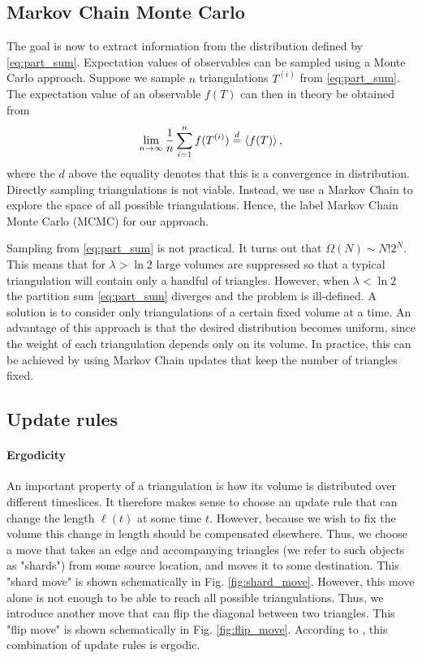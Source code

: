 
\subsection{Markov Chain Monte Carlo}

The goal is now to extract information from the distribution defined by \eqref{eq:part_sum}. Expectation values of observables can be sampled using a Monte Carlo approach. Suppose we sample $n$ triangulations $T^{(i)}$ from \eqref{eq:part_sum}. The expectation value of an observable $f(T)$ can then in theory be obtained from
\begin{equation}
    \lim_{n \to \infty} \frac{1}{n} \sum_{i = 1}^n f(T^{(i)})
    \overset{d}{=}
    \ev{f(T)}
    ,
\end{equation}
where the $d$ above the equality denotes that this is a convergence in distribution. Directly sampling triangulations is not viable. Instead, we use a Markov Chain to explore the space of all possible triangulations. Hence, the label Markov Chain Monte Carlo (MCMC) for our approach.

Sampling from \eqref{eq:part_sum} is not practical. It turns out that $\Omega(N) \sim N! 2^N$. This means that for $\lambda > \ln 2$ large volumes are suppressed so that a typical triangulation will contain only a handful of triangles.
However, when $\lambda < \ln 2$ the partition sum \eqref{eq:part_sum} diverges and the problem is ill-defined.
A solution is to consider only triangulations of a certain fixed volume at a time.
An advantage of this approach is that the desired distribution becomes uniform, since the weight of each triangulation depends only on its volume.
In practice, this can be achieved by using Markov Chain updates that keep the number of triangles fixed.

\subsection{Update rules}
\paragraph{Ergodicity}
An important property of a triangulation is how its volume is distributed over different timeslices. It therefore makes sense to choose an update rule that can change the length $\ell(t)$ at some time $t$. However, because we wish to fix the volume this change in length should be compensated elsewhere. Thus, we choose a move that takes an edge and accompanying triangles (we refer to such objects as "shards") from some source location, and moves it to some destination. This "shard move" is shown schematically in Fig. \ref{fig:shard_move}. However, this move alone is not enough to be able to reach all possible triangulations. Thus, we introduce another move that can flip the diagonal between two triangles. This "flip move" is shown schematically in Fig. \ref{fig:flip_move}. According to \cite{2012}, this combination of update rules is ergodic.

